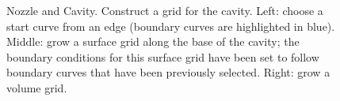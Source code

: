 {
\begin{figure}[hbt]
\newcommand{\figWidtha}{6cm}
\newcommand{\trimfig}[2]{\trimFigb{#1}{#2}{0}{.0}{.1}{.1}}
\begin{center}
\end{center}
\caption{Nozzle and Cavity. Construct a grid for the cavity. 
Left: choose a start curve from an edge (boundary curves are highlighted in blue). 
Middle: grow a surface grid along the base of the
cavity; the boundary conditions for this surface grid have been set to follow boundary curves that have been previously selected. 
Right: grow a volume grid.}
\label{fig:nozzleAndCavityBase}
\end{figure}
}


